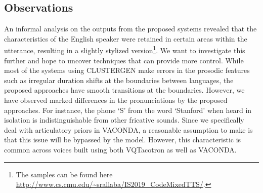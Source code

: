 \subsection{Observations}

An informal analysis on the outputs from the proposed systems revealed that the characteristics of the English speaker were retained in certain areas within the utterance, resulting in a slightly stylized version\footnote{The samples can be found here \url{http://www.cs.cmu.edu/~srallaba/IS2019_CodeMixedTTS/}.}. We want to investigate this further and hope to uncover techniques that can provide more control. While most of the systems using CLUSTERGEN \cite{rallabandi_mixedlingual_IS2017} make errors in the prosodic features such as irregular duration shifts at the boundaries between languages, the proposed approaches have smooth transitions at the boundaries. However, we have observed marked differences in the pronunciations by the proposed approaches. For instance, the phone `S' from the word `Stanford' when heard in isolation is indistinguishable from other fricative sounds. Since we specifically deal with articulatory priors in VACONDA, a reasonable assumption to make is that this issue will be bypassed by the model. However, this characteristic is common across voices built using both VQTacotron as well as VACONDA.


